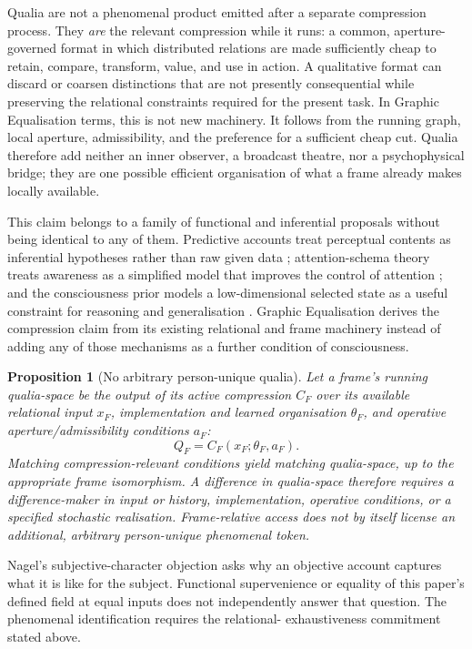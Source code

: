 \documentclass[11pt,a4paper]{article}
\newtheorem{proposition}[definition]{Proposition}
\theoremstyle{remark}\newtheorem{remark}[definition]{Remark}
\begin{document}
Qualia are not a phenomenal product emitted after a separate compression process.
They \emph{are} the relevant compression while it runs: a common, aperture-governed
format in which distributed relations are made sufficiently cheap to retain,
compare, transform, value, and use in action. A qualitative format can discard or
coarsen distinctions that are not presently consequential while preserving the
relational constraints required for the present task. In Graphic Equalisation
terms, this is not new machinery. It follows from the running graph, local
aperture, admissibility, and the preference for a sufficient cheap cut. Qualia
therefore add neither an inner observer, a broadcast theatre, nor a psychophysical
bridge; they are one possible efficient organisation of what a frame already
makes locally available.

This claim belongs to a family of functional and inferential proposals without
being identical to any of them. Predictive accounts treat perceptual contents as
inferential hypotheses rather than raw given data \cite{clarkfristonwilkinson2019};
attention-schema theory treats awareness as a simplified model that improves the
control of attention \cite{graziano2015}; and the consciousness prior models a
low-dimensional selected state as a useful constraint for reasoning and
generalisation \cite{bengio2019}. Graphic Equalisation derives the compression
claim from its existing relational and frame machinery instead of adding any of
those mechanisms as a further condition of consciousness.

\begin{proposition}[No arbitrary person-unique qualia]
\label{prop:no-arbitrary-private-qualia}
Let a frame's running qualia-space be the output of its active compression
$C_F$ over its available relational input $x_F$, implementation and learned
organisation $\theta_F$, and operative aperture/admissibility conditions $a_F$:
\[
Q_F=C_F(x_F;\theta_F,a_F).
\]
Matching compression-relevant conditions yield matching qualia-space, up to the
appropriate frame isomorphism. A difference in qualia-space therefore requires a
difference-maker in input or history, implementation, operative conditions, or a
specified stochastic realisation. Frame-relative access does not by itself license
an additional, arbitrary person-unique phenomenal token.
\end{proposition}
Nagel's subjective-character objection \cite{nagel1974} asks why an objective
account captures what it is like for the subject. Functional supervenience or
equality of this paper's defined field at equal inputs does not independently
answer that question. The phenomenal identification requires the relational-
exhaustiveness commitment stated above.
\end{document}
